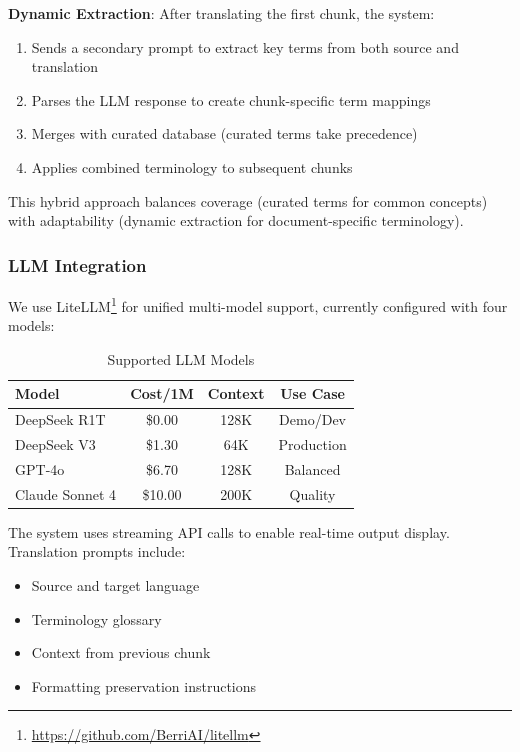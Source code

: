 \documentclass[11pt]{article}
\begin{document}
\textbf{Dynamic Extraction}: After translating the first chunk, the system:
\begin{enumerate}
    \item Sends a secondary prompt to extract key terms from both source and translation
    \item Parses the LLM response to create chunk-specific term mappings
    \item Merges with curated database (curated terms take precedence)
    \item Applies combined terminology to subsequent chunks
\end{enumerate}

This hybrid approach balances coverage (curated terms for common concepts) with adaptability (dynamic extraction for document-specific terminology).

\subsubsection{LLM Integration}

We use LiteLLM\footnote{\url{https://github.com/BerriAI/litellm}} for unified multi-model support, currently configured with four models:

\begin{table}[ht]
\centering
\small
\begin{tabular}{lccc}
\toprule
\textbf{Model} & \textbf{Cost/1M} & \textbf{Context} & \textbf{Use Case} \\
\midrule
DeepSeek R1T & \$0.00 & 128K & Demo/Dev \\
DeepSeek V3 & \$1.30 & 64K & Production \\
GPT-4o & \$6.70 & 128K & Balanced \\
Claude Sonnet 4 & \$10.00 & 200K & Quality \\
\bottomrule
\end{tabular}
\caption{Supported LLM Models}
\label{tab:models}
\end{table}

The system uses streaming API calls to enable real-time output display. Translation prompts include:
\begin{itemize}
    \item Source and target language
    \item Terminology glossary
    \item Context from previous chunk
    \item Formatting preservation instructions
\end{itemize}
\end{document}
